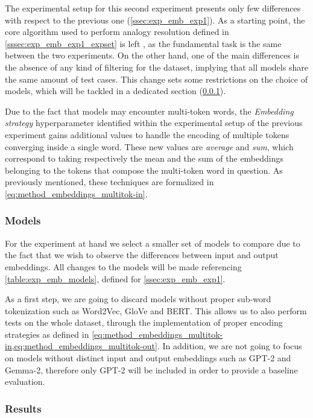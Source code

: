 The experimental setup for this second experiment presents only few differences with respect to the previous one (\cref{ssec:exp_emb_exp1}).
As a starting point, the core algorithm used to perform analogy resolution defined in \cref{sssec:exp_emb_exp1_expset} is left , as the fundamental task is the same between the two experiments.
On the other hand, one of the main differences is the absence of any kind of filtering for the dataset, implying that all models share the same amount of test cases.
This change  sets some restrictions on the choice of models, which will be tackled in a dedicated section (\cref{sssec:exp_emb_exp2_models}).

Due to the fact that models may encounter multi-token words, the \emph{Embedding strategy} hyperparameter identified within the experimental setup of the previous experiment gains additional values to handle the encoding of multiple tokens converging inside a single word.
These new values are \emph{average} and \emph{sum}, which correspond to taking respectively the mean and the sum of the embeddings belonging to the tokens that compose the multi-token word in question.
As previously mentioned, these techniques are formalized in \cref{eq:method_embeddings_multitok-in}.

\subsubsection{Models}\label{sssec:exp_emb_exp2_models}

For the experiment at hand we select a smaller set of models to compare due to the fact that we wish to observe the differences between input and output embeddings.
All changes to the models will be made referencing \cref{table:exp_emb_models}, defined for \cref{ssec:exp_emb_exp1}.

As a first step, we are going to discard models without proper sub-word tokenization such as Word2Vec, GloVe and BERT.
This allows us to also perform tests on the whole dataset, through the implementation of proper encoding strategies as defined in \cref{eq:method_embeddings_multitok-in,eq:method_embeddings_multitok-out}.
In addition, we are not going to focus on models without distinct input and output embeddings such as GPT-2 and Gemma-2, therefore only GPT-2 will be included in order to provide a baseline evaluation.

\subsubsection{Results}


